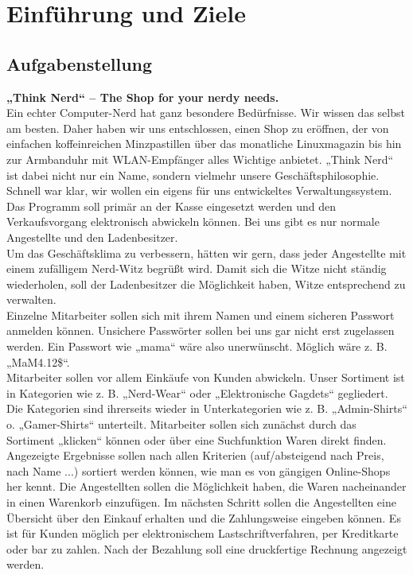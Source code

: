 \documentclass[pdftex,12pt,a4paper]{article}
\begin{document}


\tableofcontents
\newpage

\section{Einf\"uhrung und Ziele}

\subsection{Aufgabenstellung} 
\textbf{„Think Nerd“ – The Shop for your nerdy needs.}\\[.25cm]
Ein echter Computer-Nerd hat ganz besondere Bedürfnisse. Wir wissen das selbst am besten. Daher haben wir uns entschlossen, einen Shop zu eröffnen, der von einfachen koffeinreichen Minzpastillen über das monatliche Linuxmagazin bis hin zur Armbanduhr mit WLAN-Empfänger alles Wichtige anbietet. „Think Nerd“ ist dabei nicht nur ein Name, sondern vielmehr unsere Geschäftsphilosophie. Schnell war klar, wir wollen ein eigens für uns entwickeltes Verwaltungssystem. Das Programm soll primär an der Kasse eingesetzt werden und den Verkaufsvorgang elektronisch abwickeln können. Bei uns gibt es nur normale Angestellte und den Ladenbesitzer.\\
Um das Geschäftsklima zu verbessern, hätten wir gern, dass jeder Angestellte mit einem zufälligem Nerd-Witz begrüßt wird. Damit sich die Witze nicht ständig wiederholen, soll der Ladenbesitzer die Möglichkeit haben, Witze entsprechend zu verwalten.\\
Einzelne Mitarbeiter sollen sich mit ihrem Namen und einem sicheren Passwort anmelden können. Unsichere Passwörter sollen bei uns gar nicht erst zugelassen werden. Ein Passwort wie „mama“ wäre also unerwünscht. Möglich wäre z. B. „MaM4.12\$“.\\
Mitarbeiter sollen vor allem Einkäufe von Kunden abwickeln. Unser Sortiment ist in Kategorien wie z. B. „Nerd-Wear“ oder „Elektronische Gagdets“ gegliedert. Die Kategorien sind ihrerseits wieder in Unterkategorien wie z. B. „Admin-Shirts“ o. „Gamer-Shirts“ unterteilt. Mitarbeiter sollen sich zunächst durch das Sortiment „klicken“ können oder über eine Suchfunktion Waren direkt finden. Angezeigte Ergebnisse sollen nach allen Kriterien (auf/absteigend nach Preis, nach Name ...) sortiert werden können, wie man es von gängigen Online-Shops her kennt. Die Angestellten sollen die Möglichkeit haben, die Waren nacheinander in einen Warenkorb einzufügen. Im nächsten Schritt sollen die Angestellten eine Übersicht über den Einkauf erhalten und die Zahlungsweise eingeben können. Es ist für Kunden möglich per elektronischem Lastschriftverfahren, per Kreditkarte oder bar zu zahlen. Nach der Bezahlung soll eine druckfertige Rechnung angezeigt werden.\\
\end{document}
